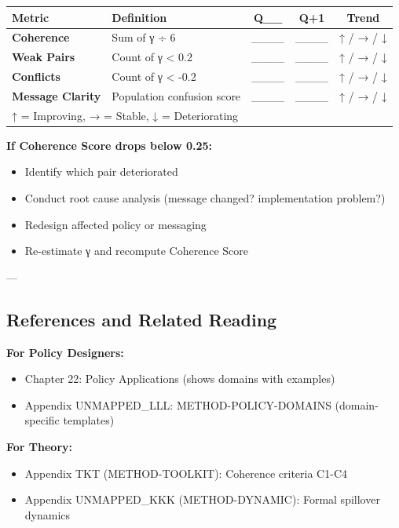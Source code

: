 \begin{center}
\begin{tabular}{@{}llccc@{}}
\toprule
\textbf{Metric} & \textbf{Definition} & \textbf{Q\_\_} & \textbf{Q+1} & \textbf{Trend} \\
\midrule
\textbf{Coherence} & Sum of γ ÷ 6 & \_\_\_\_ & \_\_\_\_ & ↑ / → / ↓ \\
\textbf{Weak Pairs} & Count of γ < 0.2 & \_\_\_\_ & \_\_\_\_ & ↑ / → / ↓ \\
\textbf{Conflicts} & Count of γ < -0.2 & \_\_\_\_ & \_\_\_\_ & ↑ / → / ↓ \\
\textbf{Message Clarity} & Population confusion score & \_\_\_\_ & \_\_\_\_ & ↑ / → / ↓ \\
\multicolumn{5}{l}{\small↑ = Improving, → = Stable, ↓ = Deteriorating} \\
\midrule
\end{tabular}
\end{center}

\textbf{If Coherence Score drops below 0.25:}
\begin{itemize}[nosep]
\item Identify which pair deteriorated
\item Conduct root cause analysis (message changed? implementation problem?)
\item Redesign affected policy or messaging
\item Re-estimate γ and recompute Coherence Score
\end{itemize}

---


\subsection*{References and Related Reading}

\textbf{For Policy Designers:}
\begin{itemize}[nosep]
\item Chapter 22: Policy Applications (shows domains with examples)
\item Appendix UNMAPPED_LLL: METHOD-POLICY-DOMAINS (domain-specific templates)
\end{itemize}

\textbf{For Theory:}
\begin{itemize}[nosep]
\item Appendix TKT (METHOD-TOOLKIT): Coherence criteria C1-C4
\item Appendix UNMAPPED_KKK (METHOD-DYNAMIC): Formal spillover dynamics
\end{itemize}

